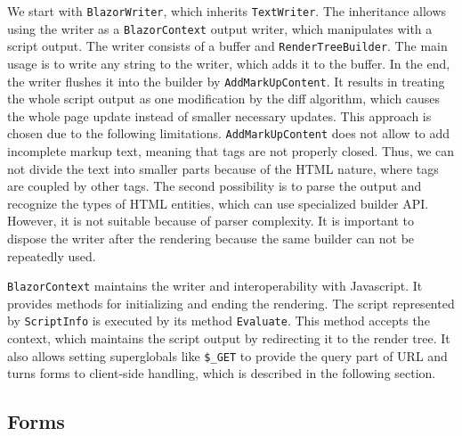 We start with \texttt{BlazorWriter}, which inherits \texttt{TextWriter}.
The inheritance allows using the writer as a \texttt{BlazorContext} output writer, which manipulates with a script output.
The writer consists of a buffer and \texttt{RenderTreeBuilder}.
The main usage is to write any string to the writer, which adds it to the buffer.
In the end, the writer flushes it into the builder by \texttt{AddMarkUpContent}.
It results in treating the whole script output as one modification by the diff algorithm, which causes the whole page update instead of smaller necessary updates.
This approach is chosen due to the following limitations.
\texttt{AddMarkUpContent} does not allow to add incomplete markup text, meaning that tags are not properly closed.
Thus, we can not divide the text into smaller parts because of the HTML nature, where tags are coupled by other tags.
The second possibility is to parse the output and recognize the types of HTML entities, which can use specialized builder API.
However, it is not suitable because of parser complexity.
It is important to dispose the writer after the rendering because the same builder can not be repeatedly used.
\par
\texttt{BlazorContext} maintains the writer and interoperability with Javascript.
It provides methods for initializing and ending the rendering.
The script represented by \texttt{ScriptInfo} is executed by its method \texttt{Evaluate}. This method accepts the context, which maintains the script output by redirecting it to the render tree.
It also allows setting superglobals like \texttt{\$\_GET} to provide the query part of URL and turns forms to client-side 
handling, which is described in the following section.

\subsection{Forms}

